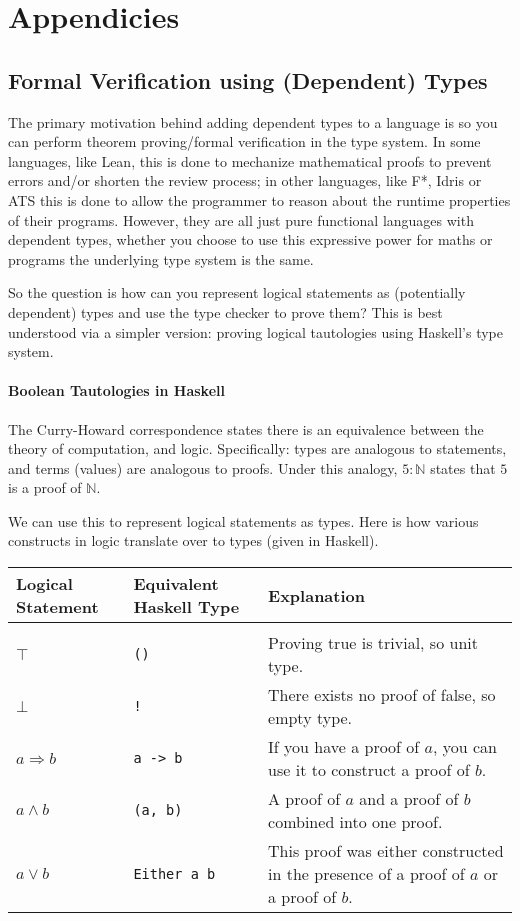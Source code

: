 \documentclass[12pt,twoside]{report}
\begin{document}



\appendix 
{}

\chapter{Appendicies}
\section{Formal Verification using (Dependent) Types}
\label{verificationwithtypes}

The primary motivation behind adding dependent types to a language is so you can perform theorem proving/formal verification in the type system. In some languages, like Lean, this is done to mechanize mathematical proofs to prevent errors and/or shorten the review process; in other languages, like F*, Idris or ATS this is done to allow the programmer to reason about the runtime properties of their programs. However, they are all just pure functional languages with dependent types, whether you choose to use this expressive power for maths or programs the underlying type system is the same.

So the question is how can you represent logical statements as (potentially dependent) types and use the type checker to prove them? This is best understood via a simpler version: proving logical tautologies using Haskell's type system.

\subsubsection{Boolean Tautologies in Haskell}
The Curry-Howard correspondence states there is an equivalence between the theory of computation, and logic. Specifically: types are analogous to statements, and terms (values) are analogous to proofs. Under this analogy, $5 : \mathbb{N}$ states that $5$ is a proof of $\mathbb{N}$.

We can use this to represent logical statements as types. Here is how various constructs in logic translate over to types (given in Haskell).

\begin{tabularx}{\textwidth}{ X|X|X }
  Logical Statement & Equivalent Haskell Type & Explanation \\
  \hline \\
  $\top$ & \verb|()| & Proving true is trivial, so unit type. \\
  $\bot$ & \verb|!| & There exists no proof of false, so empty type. \\
  $a \Rightarrow b$ & \verb|a -> b| & If you have a proof of $a$, you can use it to construct a proof of $b$. \\
  $a \wedge b$ & \verb|(a, b)| & A proof of $a$ and a proof of $b$ combined into one proof. \\
  $a \vee b$ & \verb|Either a b| & This proof was either constructed in the presence of a proof of $a$ or a proof of $b$.
\end{tabularx}
\end{document}
